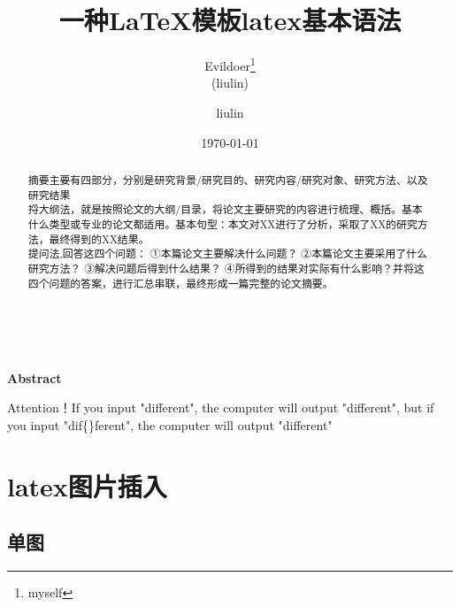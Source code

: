 \documentclass[12pt,a4paper]{article}%
\title{\fontsize{18pt}{27pt}\selectfont%
	{\heiti%
		一种\LaTeX 模板}}%
\author{\fontsize{12pt}{18pt}\selectfont%
	{\fangsong%
		Evildoer}\thanks{myself}\\%
	\fontsize{10.5pt}{15.75pt}\selectfont%
	{\fangsong%
		(liulin)}}%
\date{}%
\title{latex基本语法}
\author{liulin}
\date{\today}
\begin{document}
	\maketitle%
	\lhead{}%
	\chead{}%
	\rhead{}%
	\lfoot{}%
	\cfoot{\thepage}%
	\rfoot{}%
	
    \begin{abstract}
		\fangsong 摘要主要有四部分，分别是研究背景/研究目的、研究内容/研究对象、研究方法、以及研究结果
        \\ \indent 捋大纲法，就是按照论文的大纲/目录，将论文主要研究的内容进行梳理、概括。基本什么类型或专业的论文都适用。基本句型：本文对XX进行了分析，采取了XX的研究方法，最终得到的XX结果。
        \\ \indent 提问法,回答这四个问题：
        ①本篇论文主要解决什么问题？
        ②本篇论文主要采用了什么研究方法？
        ③解决问题后得到什么结果？
        ④所得到的结果对实际有什么影响？并将这四个问题的答案，进行汇总串联，最终形成一篇完整的论文摘要。
	\end{abstract}
	
	\begin{adjustwidth}{1.06cm}{1.06cm}
		\fontsize{10.5pt}{15.75pt}
        \\
	\end{adjustwidth}
	
	\begin{center}%
		{\textbf{Abstract}}%
	\end{center}
	\begin{adjustwidth}{1.06cm}{1.06cm}%
		\hspace{1.5em}Attention！If you input "dif{}ferent", the computer will output "different", but if you input "dif\{\}ferent", the computer will output "dif{}ferent"
	\end{adjustwidth}
	\newpage%


\section{latex图片插入}	

\subsection{单图}
\end{document}
